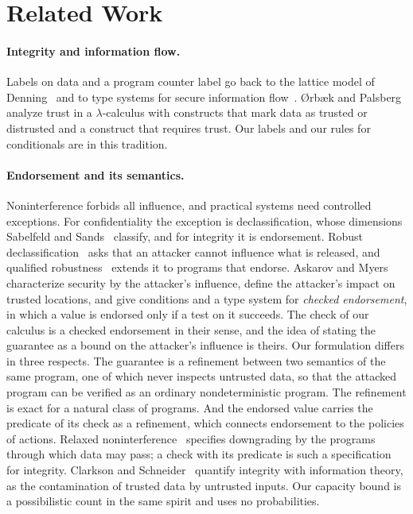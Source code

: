 \documentclass[acmsmall,nonacm,screen]{acmart}
\begin{document}
\section{Related Work}
\label{sec:related}

\paragraph{Integrity and information flow.} Labels on data and a program counter label go
back to the lattice model of Denning~\cite{denning1976} and to type systems for secure
information flow~\cite{volpano1996,sabelfeld2003}. {\O}rb{\ae}k and
Palsberg~\cite{orbaek1997} analyze trust in a $\lambda$-calculus with constructs that mark
data as trusted or distrusted and a construct that requires trust. Our labels and our rules
for conditionals are in this tradition.

\paragraph{Endorsement and its semantics.} Noninterference forbids all influence, and
practical systems need controlled exceptions. For confidentiality the exception is
declassification, whose dimensions Sabelfeld and Sands~\cite{sabelfeld2009} classify, and
for integrity it is endorsement. Robust declassification~\cite{zdancewic2001} asks that an
attacker cannot influence what is released, and qualified
robustness~\cite{myers2006} extends it to programs that endorse. Askarov and
Myers~\cite{askarov2011} characterize security by the attacker's influence, define the
attacker's impact on trusted locations, and give conditions and a type system for
\emph{checked endorsement}, in which a value is endorsed only if a test on it succeeds.
The check of our calculus is a checked endorsement in their sense, and the idea of stating
the guarantee as a bound on the attacker's influence is theirs. Our formulation differs in
three respects. The guarantee is a refinement between two semantics of the same program,
one of which never inspects untrusted data, so that the attacked program can be verified as
an ordinary nondeterministic program. The refinement is exact for a natural class of
programs. And the endorsed value carries the predicate of its check as a refinement, which
connects endorsement to the policies of actions. Relaxed
noninterference~\cite{li2005} specifies downgrading by the programs through which data may
pass; a check with its predicate is such a specification for integrity. Clarkson and
Schneider~\cite{clarkson2010} quantify integrity with information theory, as the
contamination of trusted data by untrusted inputs. Our capacity bound is a possibilistic
count in the same spirit and uses no probabilities.
\end{document}
